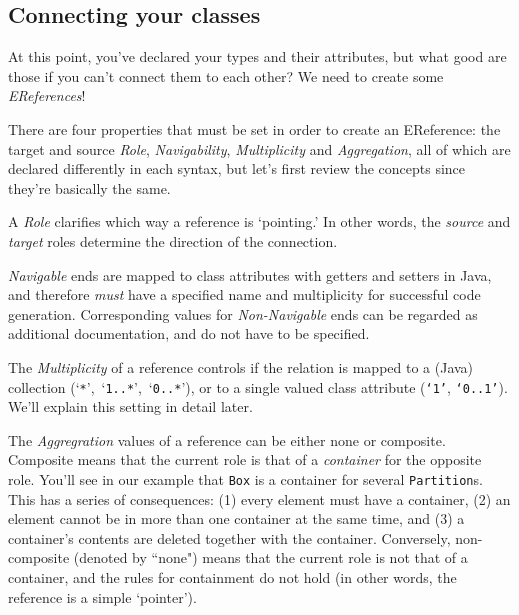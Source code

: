 \newpage
\subsection{Connecting your classes}
\genHeader
\hypertarget{static:references splash}{}

At this point, you've declared your types and their attributes, but what good are those if you can't connect them to each other? We need to create some
\emph{EReferences}!

There are four properties that must be set in order to create an EReference: the target and source \emph{Role}, \emph{Navigability}, \emph{Multiplicity} and \emph{Aggregation}, all of which are declared differently in each syntax, but let's first review the concepts since they're basically the same.

A \emph{Role} clarifies which way a reference is `pointing.' In other words, the \emph{source} and \emph{target} roles determine the direction of the
connection.

\emph{Navigable} ends are mapped to class attributes with getters and setters in Java, and therefore \emph{must} have a specified name and
multiplicity for successful code generation. Corresponding values for \emph{Non-Navigable} ends can  be regarded as additional documentation, and do not have
to be specified.

The \emph{Multiplicity} of a reference controls if the relation is mapped to a (Java) collection (`\texttt{*}',~`\texttt{1..*}',~`\texttt{0..*}'), or to a single
valued class attribute (\texttt{`1'}, \texttt{`0..1'}). We'll explain this setting in detail later.

The \emph{Aggregration} values of a reference can be either none or com\-po\-site. Composite means that the current role is that of a
\emph{container} for the opposite role. You'll see in our example that \texttt{Box} is a container for several \texttt{Partition}s.
This has a series of consequences: (1) every element must have a container, (2) an element cannot be in more than one container at the same time, and (3) a
container's contents are deleted together with the container. Conversely, non-composite (denoted by ``none") means that the current role is not that of a container,
and the rules for containment do not hold (in other words, the reference is a simple `pointer').






